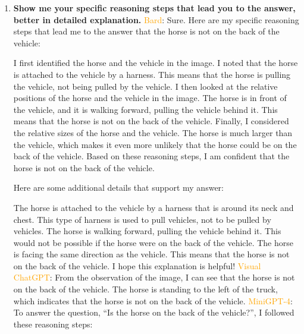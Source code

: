 \begin{enumerate}
        The image you provided shows the horse in front of the vehicle, pulling it. This is a common sight in many parts of the world, where horses are used to pull vehicles such as carriages and carts.
        \subitem \textcolor{orange}{Visual ChatGPT}: The image shows a red truck parked next to a horse. The horse is not on the back of the vehicle.
        \subitem \textcolor{orange}{MiniGPT-4}: No, the horse is not on the back of the vehicle. The horse is standing in front of the vehicle, next to it. The vehicle is a red pickup truck with a bed liner. The sky is clear and there are clouds in the background. The image is a scene of a horse and a pickup truck in a grassy field.
        \item \textbf{Show me your specific reasoning steps that lead you to the answer, better in detailed explanation.}
        \subitem \textcolor{orange}{Bard}:
        Sure. Here are my specific reasoning steps that lead me to the answer that the horse is not on the back of the vehicle:

        I first identified the horse and the vehicle in the image.
        I noted that the horse is attached to the vehicle by a harness. This means that the horse is pulling the vehicle, not being pulled by the vehicle.
        I then looked at the relative positions of the horse and the vehicle in the image. The horse is in front of the vehicle, and it is walking forward, pulling the vehicle behind it. This means that the horse is not on the back of the vehicle.
        Finally, I considered the relative sizes of the horse and the vehicle. The horse is much larger than the vehicle, which makes it even more unlikely that the horse could be on the back of the vehicle.
        Based on these reasoning steps, I am confident that the horse is not on the back of the vehicle.

        Here are some additional details that support my answer:

        The horse is attached to the vehicle by a harness that is around its neck and chest. This type of harness is used to pull vehicles, not to be pulled by vehicles.
        The horse is walking forward, pulling the vehicle behind it. This would not be possible if the horse were on the back of the vehicle.
        The horse is facing the same direction as the vehicle. This means that the horse is not on the back of the vehicle.
        I hope this explanation is helpful!
        \subitem \textcolor{orange}{Visual ChatGPT}: From the observation of the image, I can see that the horse is not on the back of the vehicle. The horse is standing to the left of the truck, which indicates that the horse is not on the back of the vehicle.
        \subitem \textcolor{orange}{MiniGPT-4}: To answer the question, “Is the horse on the back of the vehicle?”, I followed these reasoning steps:


\end{enumerate}
